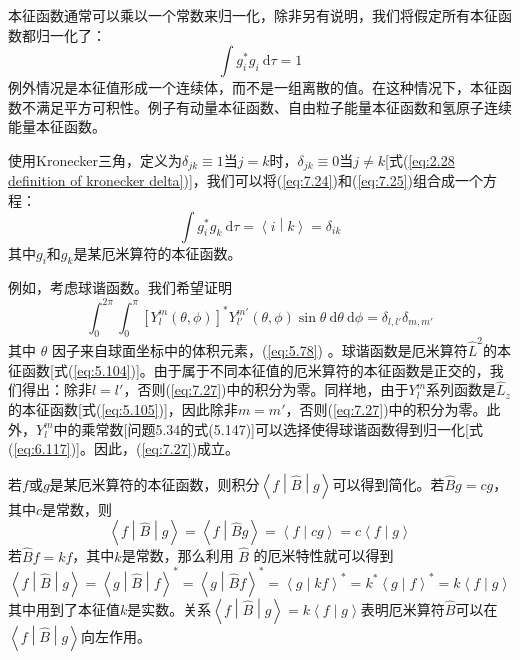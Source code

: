     本征函数通常可以乘以一个常数来归一化，除非另有说明，我们将假定所有本征函数都归一化了：
    \begin{equation}
        \int g_i^{\ast} g_i \:\mathrm{d}\tau = 1
        \label{eq:7.25}
    \end{equation}
    例外情况是本征值形成一个连续体，而不是一组离散的值。在这种情况下，本征函数不满足平方可积性。例子有动量本征函数、自由粒子能量本征函数和氢原子连续能量本征函数。

    使用Kronecker三角，定义为$\delta_{jk} \equiv 1$当$j=k$时，$\delta_{jk} \equiv 0$当$j \neq k$[式(\ref{eq:2.28 definition of kronecker delta})]，我们可以将(\ref{eq:7.24})和(\ref{eq:7.25})组合成一个方程：
    \begin{equation}
        \int g_i^{\ast}g_k \: \mathrm{d}\tau = \left\langle i \middle| k \right\rangle = \delta_{ik}
        \label{eq:7.26}
    \end{equation}
    其中$g_i$和$g_k$是某厄米算符的本征函数。

    例如，考虑球谐函数。我们希望证明
    \begin{equation}
        \int_{0}^{2\pi}\int_{0}^{\pi}\left[Y_l^m\left(\theta,\phi\right)\right]^{\ast}Y_{l'}^{m'}\left(\theta,\phi\right)\sin\theta \:\mathrm{d}\theta \:\mathrm{d}\phi = \delta_{l,l'}\delta_{m,m'}
        \label{eq:7.27}
    \end{equation}
    其中 $\theta$ 因子来自球面坐标中的体积元素，(\ref{eq:5.78}) 。球谐函数是厄米算符$\hat{L}^2$的本征函数[式(\ref{eq:5.104})]。由于属于不同本征值的厄米算符的本征函数是正交的，我们得出：除非$l = l'$，否则(\ref{eq:7.27})中的积分为零。同样地，由于$Y_l^m$系列函数是$\hat{L}_z$的本征函数[式(\ref{eq:5.105})]，因此除非$m = m'$，否则(\ref{eq:7.27})中的积分为零。此外，$Y_l^m$中的乘常数[问题5.34的式(5.147)]可以选择使得球谐函数得到归一化[式(\ref{eq:6.117})]。因此，(\ref{eq:7.27})成立。

    若$f$或$g$是某厄米算符的本征函数，则积分$\left\langle f \middle| \hat{B} \middle| g \right\rangle$可以得到简化。若$\hat{B}g = c g$，其中$c$是常数，则
    \begin{equation*}
        \left\langle f \middle| \hat{B} \middle| g \right\rangle = \left\langle f \middle| \hat{B}g \right\rangle = \left\langle f \middle| c g \right\rangle = c \left\langle f \middle| g \right\rangle
    \end{equation*}
    若$\hat{B}f = kf$，其中$k$是常数，那么利用 $\hat{B}$ 的厄米特性就可以得到
    \begin{equation*}
        \left\langle f \middle| \hat{B} \middle| g \right\rangle = \left\langle g \middle| \hat{B} \middle| f \right\rangle^{\ast} = \left\langle g \middle| \hat{B}f \right\rangle^{\ast} = \left\langle g \middle| kf \right\rangle^{\ast} = k^{\ast} \left\langle g \middle| f \right\rangle^{\ast} = k\left\langle f \middle| g \right\rangle
    \end{equation*}
    其中用到了本征值$k$是实数。关系$\left\langle f \middle| \hat{B} \middle| g \right\rangle = k \left\langle f \middle| g \right\rangle$表明厄米算符$\hat{B}$可以在$\left\langle f \middle| \hat{B} \middle| g \right\rangle$向左作用。

